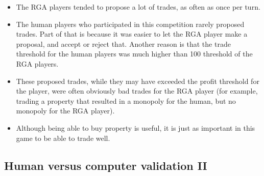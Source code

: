 \begin{itemize} 
  \item {The RGA players tended to propose a lot of trades, as often
  as once per turn.}
  \item {The human players who participated in this competition rarely proposed
  trades. Part of that is because it was easier to let the RGA player make a 
  proposal, and accept or reject that. Another reason is that the trade 
  threshold for the human players was much higher than 100 threshold of the RGA 
  players.}
  \item {These proposed trades, while they may have exceeded the profit 
  threshold for the player, were often obviously bad trades for the RGA player 
  (for example, trading a property that resulted in a monopoly for the human, 
  but no monopoly for the RGA player).}
  \item {Although being able to buy property is useful, it is just as important
  in this game to be able to trade well.}
\end{itemize}

 \subsection{Human versus computer validation II}
 
 